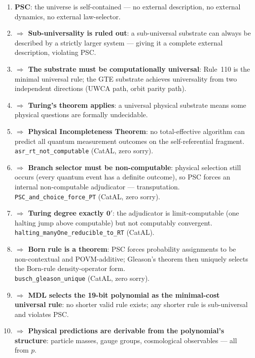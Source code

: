\documentclass[11pt,a4paper]{article}
\newcommand{\lean}[1]{\texttt{#1}}
\begin{document}
\begin{tcolorbox}[colback=boxpurple,colframe=purple!50!black,
  title=The Complete Logical Chain]
\begin{enumerate}
\item \textbf{PSC}: the universe is self-contained — no external description, no
  external dynamics, no external law-selector.
\item \textbf{$\Rightarrow$ Sub-universality is ruled out}: a sub-universal substrate
  can always be described by a strictly larger system — giving it a complete external
  description, violating PSC.
\item \textbf{$\Rightarrow$ The substrate must be computationally universal}: Rule~110
  is the minimal universal rule; the GTE substrate achieves universality from two
  independent directions (UWCA path, orbit parity path).
\item \textbf{$\Rightarrow$ Turing's theorem applies}: a universal physical substrate
  means some physical questions are formally undecidable.
\item \textbf{$\Rightarrow$ Physical Incompleteness Theorem}: no total-effective
  algorithm can predict all quantum measurement outcomes on the self-referential fragment.\\
  \lean{asr\_rt\_not\_computable} (CatAL, zero sorry).
\item \textbf{$\Rightarrow$ Branch selector must be non-computable}: physical selection
  still occurs (every quantum event has a definite outcome), so PSC forces an internal
  non-computable adjudicator — transputation.\\
  \lean{PSC\_and\_choice\_force\_PT} (CatAL, zero sorry).
\item \textbf{$\Rightarrow$ Turing degree exactly $\mathbf{0}'$}: the adjudicator is
  limit-computable (one halting jump above computable) but not computably convergent.\\
  \lean{halting\_manyOne\_reducible\_to\_RT} (CatAL).
\item \textbf{$\Rightarrow$ Born rule is a theorem}: PSC forces probability assignments
  to be non-contextual and POVM-additive; Gleason's theorem then uniquely selects the
  Born-rule density-operator form.\\
  \lean{busch\_gleason\_unique} (CatAL, zero sorry).
\item \textbf{$\Rightarrow$ MDL selects the 19-bit polynomial as the minimal-cost
  universal rule}: no shorter valid rule exists; any shorter rule is sub-universal
  and violates PSC.
\item \textbf{$\Rightarrow$ Physical predictions are derivable from the polynomial's
  structure}: particle masses, gauge groups, cosmological observables — all from $p$.
\end{enumerate}
\end{tcolorbox}
\end{document}
